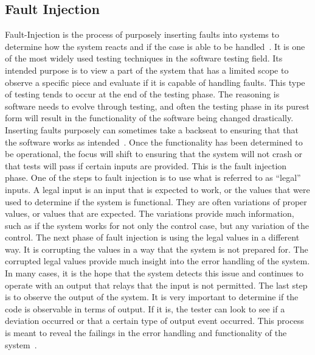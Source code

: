   \subsection{Fault Injection}
  Fault-Injection is the process of purposely inserting faults into systems to determine how the system reacts and if the case is able to be handled~\cite{friedman_voas_1995}. It is one of the most widely used testing techniques in the software testing field. Its intended purpose is to view a part of the system that has a limited scope to observe a specific piece and evaluate if it is capable of handling faults. This type of testing tends to occur at the end of the testing phase. The reasoning is software needs to evolve through testing, and often the testing phase in its purest form will result in the functionality of the software being changed drastically. Inserting faults purposely can sometimes take a backseat to ensuring that that the software works as intended~\cite{voas_mcgraw_1998}. Once the functionality has been determined to be operational, the focus will shift to ensuring that the system will not crash or that tests will pass if certain inputs are provided. This is the fault injection phase. One of the steps to fault injection is to use what is referred to as ``legal'' inputs. A legal input is an input that is expected to work, or the values that were used to determine if the system is functional. They are often variations of proper values, or values that are expected. The variations provide much information, such as if the system works for not only the control case, but any variation of the control. The next phase of fault injection is using the legal values in a different way. It is corrupting the values in a way that the system is not prepared for. The corrupted legal values provide much insight into the error handling of the system. In many cases, it is the hope that the system detects this issue and continues to operate with an output that relays that the input is not permitted. The last step is to observe the output of the system. It is very important to determine if the code is observable in terms of output. If it is, the tester can look to see if a deviation occurred or that a certain type of output event occurred. This process is meant to reveal the failings in the error handling and functionality of the system~\cite{voas_mcgraw_1998}.

